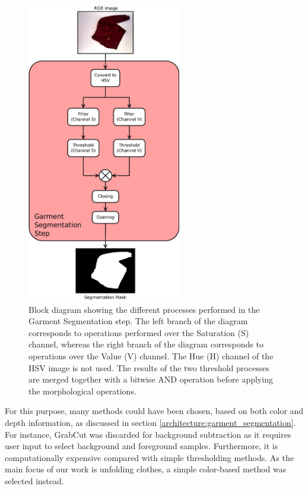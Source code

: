 \begin{figure}[thpb]
    \centering
    \includegraphics[width=0.6\textwidth]
    {figures/Garment-segmentation-process-diagram.pdf}
    \caption[Block diagram showing the different processes performed in the Garment Segmentation step.]
    {Block diagram showing the different processes performed in the Garment Segmentation step. The left branch of the diagram corresponds to operations performed over the Saturation (S) channel, whereas the right branch of the diagram corresponds to operations over the Value (V) channel. The Hue (H) channel of the HSV image is not used. The results of the two threshold processes are merged together with a bitwise AND operation before applying the morphological operations.}
    \label{fig:background_subtration_processes}
\end{figure}

For this purpose, many methods could have been chosen, based on both color and depth information, as discussed in section \ref{architecture:garment_segmentation}. For instance, GrabCut \cite{rother2004grabcut} was discarded for background subtraction as it requires user input to select background and foreground samples. Furthermore, it is computationally expensive compared with simple thresholding methods. As the main focus of our work is unfolding clothes, a simple color-based method was selected instead. 


